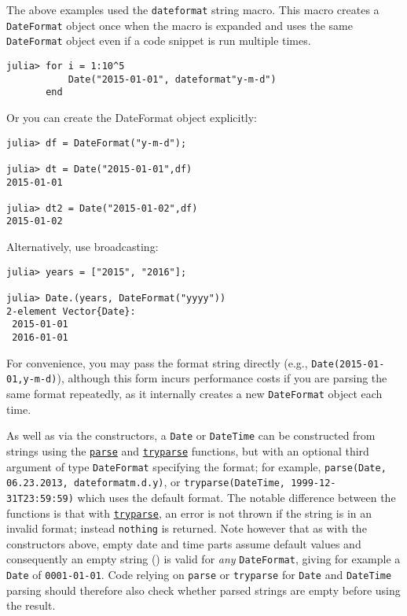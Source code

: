 The above examples used the \texttt{dateformat{\textquotedbl}{\textquotedbl}} string macro. This macro creates a \texttt{DateFormat} object once when the macro is expanded and uses the same \texttt{DateFormat} object even if a code snippet is run multiple times.




\begin{verbatim}
julia> for i = 1:10^5
           Date("2015-01-01", dateformat"y-m-d")
       end
\end{verbatim}



Or you can create the DateFormat object explicitly:




\begin{verbatim}
julia> df = DateFormat("y-m-d");

julia> dt = Date("2015-01-01",df)
2015-01-01

julia> dt2 = Date("2015-01-02",df)
2015-01-02
\end{verbatim}



Alternatively, use broadcasting:




\begin{verbatim}
julia> years = ["2015", "2016"];

julia> Date.(years, DateFormat("yyyy"))
2-element Vector{Date}:
 2015-01-01
 2016-01-01
\end{verbatim}



For convenience, you may pass the format string directly (e.g., \texttt{Date({\textquotedbl}2015-01-01{\textquotedbl},{\textquotedbl}y-m-d{\textquotedbl})}), although this form incurs performance costs if you are parsing the same format repeatedly, as it internally creates a new \texttt{DateFormat} object each time.



As well as via the constructors, a \texttt{Date} or \texttt{DateTime} can be constructed from strings using the \hyperlink{14207407853646164654}{\texttt{parse}} and \hyperlink{16455869400787770938}{\texttt{tryparse}} functions, but with an optional third argument of type \texttt{DateFormat} specifying the format; for example, \texttt{parse(Date, {\textquotedbl}06.23.2013{\textquotedbl}, dateformat{\textquotedbl}m.d.y{\textquotedbl})}, or \texttt{tryparse(DateTime, {\textquotedbl}1999-12-31T23:59:59{\textquotedbl})} which uses the default format. The notable difference between the functions is that with \hyperlink{16455869400787770938}{\texttt{tryparse}}, an error is not thrown if the string is in an invalid format; instead \texttt{nothing} is returned.  Note however that as with the constructors above, empty date and time parts assume default values and consequently an empty string (\texttt{{\textquotedbl}{\textquotedbl}}) is valid for \emph{any} \texttt{DateFormat}, giving for example a \texttt{Date} of \texttt{0001-01-01}.  Code relying on \texttt{parse} or \texttt{tryparse} for \texttt{Date} and \texttt{DateTime} parsing should therefore also check whether parsed strings are empty before using the result.



